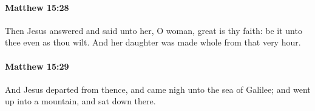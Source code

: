 		\paragraph{Matthew 15:28} %
			\label{MATTHEW-15-28}

			Then Jesus answered and said unto her, O woman, great is thy faith: be it unto thee even as thou wilt. And her daughter was made whole from that very hour.

			\begin{framed}
			\scriptsize
				\begin{compactdesc}
					\item[SBLG] 
				\end{compactdesc}
			\end{framed}

		\paragraph{Matthew 15:29} %
			\label{MATTHEW-15-29}

			And Jesus departed from thence, and came nigh unto the sea of Galilee; and went up into a mountain, and sat down there.


